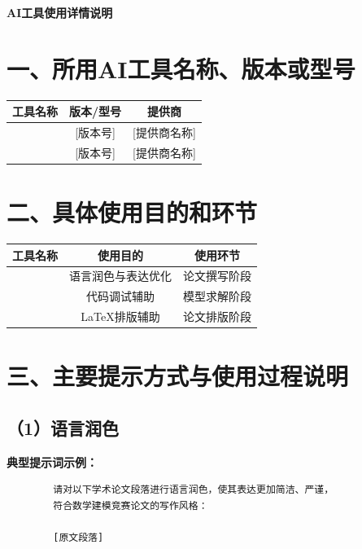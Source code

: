 \documentclass[a4paper,12pt]{article}
\begin{document}
	
	\begin{center}
		{\LARGE\bfseries AI工具使用详情说明} \\[0.5cm]
	\end{center}
	
	\section*{一、所用AI工具名称、版本或型号}
	
	\begin{table}[H]
		\centering
		\begin{tabular}{c|c|c}
			\hline
			\textbf{工具名称} & \textbf{版本/型号} & \textbf{提供商} \\
			\hline
			[工具名称1] & [版本号] & [提供商名称] \\
			[工具名称2] & [版本号] & [提供商名称] \\
			\hline
		\end{tabular}
	\end{table}
	
	\section*{二、具体使用目的和环节}
	
	\begin{table}[H]
		\centering
		\begin{tabular}{c|c|c}
			\hline
			\textbf{工具名称} & \textbf{使用目的} & \textbf{使用环节} \\
			\hline
			[工具名称1] & 语言润色与表达优化 & 论文撰写阶段 \\
			[工具名称2] & 代码调试辅助 & 模型求解阶段 \\
			[工具名称3] & LaTeX排版辅助 & 论文排版阶段 \\
			\hline
		\end{tabular}
	\end{table}
	
	\section*{三、主要提示方式与使用过程说明}
	
	\subsection*{（1）语言润色}
	
	\textbf{典型提示词示例：}
	
	\begin{verbatim}
		请对以下学术论文段落进行语言润色，使其表达更加简洁、严谨，
		符合数学建模竞赛论文的写作风格：
		
		[原文段落]
	\end{verbatim}
	
\end{document}
